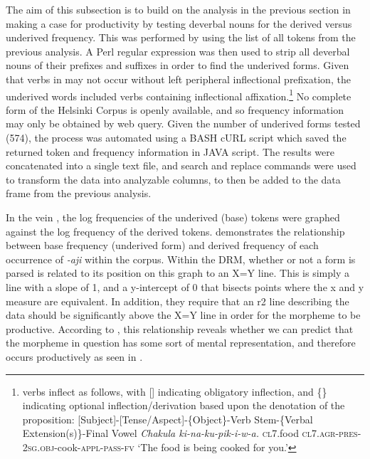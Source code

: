 \documentclass[output=paper,modfonts]{langscibook}
\begin{document}
The aim of this subsection is to build on the analysis in the previous section in making a case for productivity by testing  deverbal nouns for the derived versus underived frequency. This was performed by using the list of all tokens from the previous analysis. A Perl regular expression was then used to strip all deverbal nouns of their  prefixes and  suffixes in order to find the underived forms. Given that verbs in  may not occur without left peripheral inflectional prefixation, the underived words included verbs containing inflectional affixation.{}\footnote{ verbs inflect as follows, with [] indicating obligatory inflection, and \{\} indicating optional inflection/derivation based upon the denotation of the proposition:    [Subject]-[Tense/Aspect]-\{Object\}-Verb Stem-\{Verbal Extension(s)\}-Final Vowel
\textit{Chakula ki-na-ku-pik-i-w-a.}
\textsc{cl7}.food \textsc{cl7}.\textsc{agr}-\textsc{pres}-\textsc{2sg}.\textsc{obj}-cook-\textsc{appl}-\textsc{pass}-\textsc{fv}
‘The food is being cooked for you.’
}  No complete form of the Helsinki  Corpus is openly available, and so frequency information may only be obtained by web query. Given the number of underived forms tested (574), the process was automated using a BASH cURL script which saved the returned token and frequency information in JAVA script. The results were concatenated into a single text file, and search and replace commands were used to transform the data into analyzable columns, to then be added to the data frame from the previous analysis.

In the vein \citet{HayBaayen2002}, the log frequencies of the underived (base) tokens were graphed against the log frequency of the derived tokens.  demonstrates the relationship between base frequency (underived form) and derived frequency of each occurrence of \textit{-aji} within the corpus. Within the DRM, whether or not a form is parsed is related to its position on this graph to an X=Y line. This is simply a line with a slope of 1, and a y-intercept of 0 that bisects points where the x and y measure are equivalent. In addition, they require that an r2 line describing the data should be significantly above the X=Y line in order for the morpheme to be productive. According to \citeauthor{HayBaayen2002}, this relationship reveals whether we can predict that the morpheme in question has some sort of mental representation, and therefore occurs productively as seen in .
\end{document}
